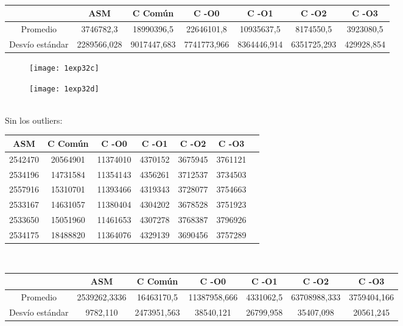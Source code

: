 ﻿\documentclass[a4paper]{article}
\begin{document}
\ \\
\begin{center}
  \begin{tabular}{| c | c | c | c | c | c | c |}
    \hline
      & ASM & C Com\'un& C -O0 & C -O1 & C -O2 & C -O3 \\
      \hline\hline
      Promedio	& 3746782,3  &18990396,5 & 22646101,8  &10935637,5 & 8174550,5 &3923080,5\\
      \hline
      Desvío estándar & 2289566,028& 9017447,683 & 7741773,966 & 8364446,914 &6351725,293&  429928,854\\
      \hline
  \end{tabular}
\end{center}


\begin{figure}[h]
  \centering
    \texttt{[image: 1exp32c]}
\end{figure}

\begin{figure}[h]
  \centering
    \texttt{[image: 1exp32d]}
\end{figure}



\ \\
Sin los outliers:
\ \\
\begin{center}
  \begin{tabular}{| c | c | c | c | c | c | c |}
    \hline
    ASM & C Com\'un &C -O0 & C -O1 & C -O2 & C -O3\\ 
    \hline\hline
    2542470 &20564901  &11374010 &4370152 &3675945 &3761121\\
    \hline
    2534196 &14731584  &11354143 &4356261 &3712537 &3734503\\
    \hline
    2557916 &15310701  &11393466 &4319343 &3728077 &3754663\\
    \hline
    2533167 &14631057  &11380404 &4304202 &3678528 &3751923\\
    \hline
    2533650 &15051960  &11461653 &4307278 &3768387 &3796926\\
    \hline
    2534175 &18488820  &11364076 &4329139 &3690456 &3757289\\
    \hline
  \end{tabular}
\end{center}
\ \\

\begin{center}
  \begin{tabular}{| c | c | c | c | c | c | c |}
    \hline
      & ASM & C Com\'un& C -O0 & C -O1 & C -O2 & C -O3 \\
      \hline\hline
      Promedio	& 2539262,3336 &16463170,5 & 11387958,666 & 4331062,5& 63708988,333 &3759404,166\\
      \hline
      Desvío estándar & 9782,110&  2473951,563&  38540,121&  26799,958& 35407,098&  20561,245\\
      \hline
  \end{tabular}
\end{center}
\ \\
\end{document}
